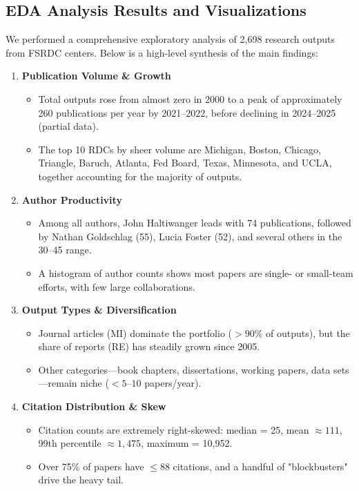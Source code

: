 \documentclass[12pt]{article}
\begin{document}
\subsection{EDA Analysis Results and Visualizations}
We performed a comprehensive exploratory analysis of 2,698 research outputs from FSRDC centers. Below is a high-level synthesis of the main findings:

\begin{enumerate}
  \item \textbf{Publication Volume \& Growth}
    \begin{itemize}
      \item Total outputs rose from almost zero in 2000 to a peak of approximately 260 publications per year by 2021–2022, before declining in 2024–2025 (partial data).
      \item The top 10 RDCs by sheer volume are Michigan, Boston, Chicago, Triangle, Baruch, Atlanta, Fed Board, Texas, Minnesota, and UCLA, together accounting for the majority of outputs.
    \end{itemize}

  \item \textbf{Author Productivity}
    \begin{itemize}
      \item Among all authors, John Haltiwanger leads with 74 publications, followed by Nathan Goldschlag (55), Lucia Foster (52), and several others in the 30–45 range.
      \item A histogram of author counts shows most papers are single- or small-team efforts, with few large collaborations.
    \end{itemize}

  \item \textbf{Output Types \& Diversification}
    \begin{itemize}
      \item Journal articles (MI) dominate the portfolio (\(>90\%\) of outputs), but the share of reports (RE) has steadily grown since 2005.
      \item Other categories—book chapters, dissertations, working papers, data sets—remain niche (\(<5\text{--}10\) papers/year).
    \end{itemize}

  \item \textbf{Citation Distribution \& Skew}
    \begin{itemize}
      \item Citation counts are extremely right-skewed: median = 25, mean \(\approx 111\), 99th percentile \(\approx 1{,}475\), maximum = 10{,}952.
      \item Over 75\% of papers have \(\le88\) citations, and a handful of "blockbusters" drive the heavy tail.
    \end{itemize}


\end{enumerate}
\end{document}
